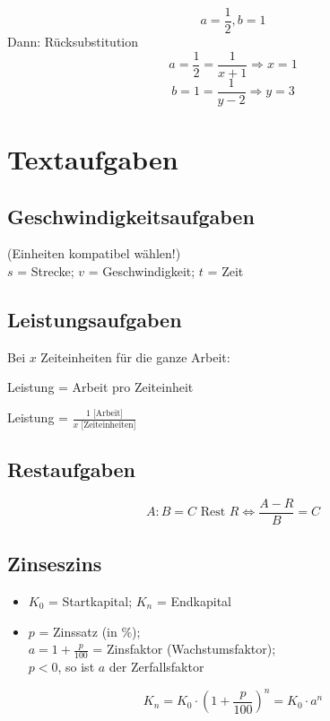 \begin{multicols}{2}

$$a=\frac12, b=1$$
Dann: Rücksubstitution
$$a=\frac12=\frac{1}{x+1} \Longrightarrow  x=1$$
$$b=1=\frac{1}{y-2} \Longrightarrow  y=3$$



\section*{Textaufgaben}
\subsection*{Geschwindigkeitsaufgaben}
 (Einheiten kompatibel wählen!)\\
$s$ = Strecke; $v$ = Geschwindigkeit; $t$ = Zeit

\subsection*{Leistungsaufgaben}
Bei $x$ Zeiteinheiten für die ganze Arbeit:

Leistung = Arbeit pro Zeiteinheit

Leistung = $\frac{1 \textrm{ [Arbeit]}}{x \textrm{ [Zeiteinheiten]}}$


\subsection*{Restaufgaben}
$$A:B = C \textrm{ Rest } R \Leftrightarrow{}\frac{A-R}B=C$$


\subsection*{Zinseszins}
\begin{itemize}
\item $K_0$ = Startkapital; $K_n$ = Endkapital
\item $p$ = Zinssatz (in \%);\\ $a = 1+\frac{p}{100}$ = Zinsfaktor
(Wachstumsfaktor);\\ $p<0$, so ist $a$ der Zerfallsfaktor
\end{itemize}
$$K_n = K_0 \cdot{} \left( 1+\frac{p}{100} \right)^n = K_0\cdot{}a^n$$


\end{multicols}
